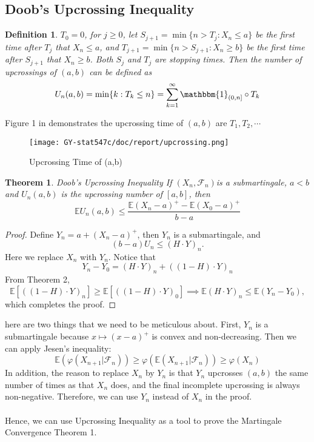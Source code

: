 \documentclass[10pt]{article}
\newtheorem{theorem}{Theorem}
\newtheorem{definition}{Definition}
\begin{document}
\subsection{Doob's Upcrossing Inequality}
\begin{definition}
$T_0=0$, for $j \ge 0$, let $S_{j+1}=\min\{n>T_j: X_n \le a\}$ be the first time after $T_j$ that $X_n \le a$, and $T_{j+1}=\min\{n > S_{j+1}:X_n \ge b\}$ be the first time after $S_{j+1}$ that $X_n \ge b$. Both $S_j$ and $T_j$ are stopping times.  Then the number of upcrossings of $(a,b)$ can be defined as 
$$U_n(a,b)=\min\{k: T_k \le n\}=\sum_{k=1}^{\infty}\mathbbm{1}_{(0,n]}\circ T_k$$
\end{definition}
 Figure 1 in \cite{Cinlar:2011} demonstrates the upcrossing time of $(a,b)$ are $T_1, T_2, \cdots$
\begin{figure}[h!]
\centering
  \texttt{[image: GY-stat547c/doc/report/upcrossing.png]}
  \caption{Upcrossing Time of (a,b)}
  \label{fig:birds}
\end{figure}
\begin{theorem}{Doob’s Upcrossing Inequality}
If $(X_n, \mathcal{F}_n)$is a submartingale, $a<b$ and $U_n(a,b)$ is the upcrossing number of $[a,b]$, then $$\mathbb{E}U_n(a,b)\le\frac{\mathbb{E}(X_n-a)^+-\mathbb{E}(X_0-a)^{+}}{b-a}$$
\end{theorem}
\begin{proof}
Define $Y_n=a+(X_n-a)^{+}$, then $Y_n$ is a submartingale, and $$(b-a)U_n \le (H \cdot Y)_n.$$ Here we replace $X_n$ with $Y_n$.
Notice that $$Y_n-Y_0=(H \cdot Y)_n+((1-H)\cdot Y)_n$$ From Theorem 2,  $$\mathbb{E}[((1-H)\cdot Y)_n] \ge \mathbb{E}[((1-H)\cdot Y)_0] \implies \mathbb{E}(H \cdot Y)_n \le \mathbb{E}(Y_n-Y_0),$$ which completes the proof.
\end{proof}
here are two things that we need to be meticulous about. First, $Y_n$ is a submartingale because $x \mapsto (x-a)^{+}$ is convex and non-decreasing. Then we can apply Jesen's inequality:
$$\mathbb{E}(\varphi(X_{n+1}|\mathcal{F}_n))\ge \varphi(\mathbb{E}(X_{n+1}|\mathcal{F}_n))\ge \varphi(X_n)$$
In addition, the reason to replace $X_n$ by $Y_n$ is that $Y_n$ upcrosses $(a,b)$ the same number of times as that $X_n$ does, and the final incomplete upcrossing is always non-negative. Therefore, we can use $Y_n$ instead of $X_n$ in the proof.\\\\ 
Hence, we can use Upcrossing Inequality as a tool to prove the Martingale Convergence Theorem 1.
\end{document}
